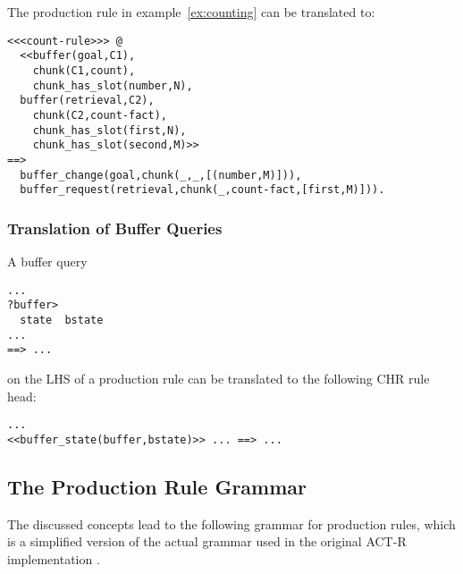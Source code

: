 \begin{example}
The production rule in example~\ref{ex:counting} can be translated to:

\begin{lstlisting}
<<<count-rule>>> @
  <<buffer(goal,C1), 
    chunk(C1,count),
    chunk_has_slot(number,N),
  buffer(retrieval,C2),
    chunk(C2,count-fact),
    chunk_has_slot(first,N),
    chunk_has_slot(second,M)>>
==>
  buffer_change(goal,chunk(_,_,[(number,M)])),
  buffer_request(retrieval,chunk(_,count-fact,[first,M)])).
\end{lstlisting}

\end{example}


\subsubsection{Translation of Buffer Queries}

A buffer query

\begin{lstlisting}
...
?buffer>
  state  bstate 
...
==> ...
\end{lstlisting}

on the LHS of a production rule can be translated to the following CHR rule head:

\begin{lstlisting}
...
<<buffer_state(buffer,bstate)>> ... ==> ...
\end{lstlisting}

\subsection{The Production Rule Grammar}
\label{implementation:production_rule_grammar}

The discussed concepts lead to the following grammar for production rules, which is a simplified version of the actual grammar used in the original ACT-R implementation \cite[p. 162]{actr_reference}. 


